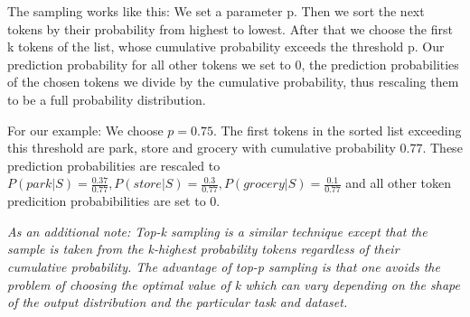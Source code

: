 \documentclass[a4paper,12pt]{extarticle}
\begin{document}
The sampling works like this: We set a parameter p. Then we sort the next tokens by their probability from highest to lowest. After that we choose the first k tokens of the list, whose cumulative probability exceeds the threshold p. Our prediction probability for all other tokens we set to 0, the prediction probabilities of the chosen tokens we divide by the cumulative probability, thus rescaling them to be a full probability distribution.\newline

For our example: We choose $p = 0.75$. The first tokens in the sorted list exceeding this threshold are park, store and grocery with cumulative probability $0.77$. These prediction probabilities are rescaled to $P(park|S) = \frac{0.37}{0.77}, P(store|S) = \frac{0.3}{0.77}, P(grocery|S) = \frac{0.1}{0.77}$ and all other token predicition probabibilities are set to 0.\newline

\textit{As an additional note: Top-k sampling is a similar technique except that the sample is taken from the k-highest probability tokens regardless of their cumulative probability. The advantage of top-p sampling is that one avoids the problem of choosing the optimal value of k which can vary depending on the shape of the output distribution and the particular task and dataset.} 
\end{document}
